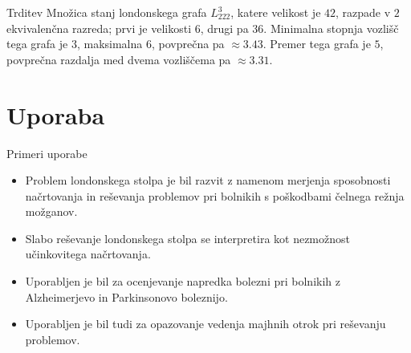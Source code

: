 \documentclass[dvipsnames]{beamer}
\newcommand{\graf}[1][G]{\ensuremath{#1 = (V(#1), E(#1))}}
\DeclareMathOperator {\stopnja} {deg}
\begin{document}
\begin{frame}
    \begin{block}{Trditev}
        \label{trd:simetrije-L222na3}
        Množica stanj londonskega grafa $L_{222}^3$, katere velikost je $42$, razpade v $2$ ekvivalenčna razreda; prvi je velikosti $6$, drugi pa $36$. Minimalna stopnja vozlišč tega grafa je $3$, maksimalna $6$, povprečna pa $\approx 3.43$. Premer tega grafa je $5$, povprečna razdalja med dvema vozliščema pa $\approx 3.31$. 
    \end{block}
\end{frame}

%    

\section{Uporaba}
\begin{frame}{Primeri uporabe}
    \begin{itemize}
        \item Problem londonskega stolpa je bil razvit z namenom merjenja sposobnosti načrtovanja in reševanja problemov pri bolnikih s poškodbami čelnega režnja možganov.
        \item Slabo reševanje londonskega stolpa se interpretira kot nezmožnost učinkovitega načrtovanja.
        \item Uporabljen je bil za ocenjevanje napredka bolezni pri bolnikih z Alzheimerjevo in Parkinsonovo boleznijo.
        \item Uporabljen je bil tudi za opazovanje vedenja majhnih otrok pri reševanju problemov.
    \end{itemize}
\end{frame}
\end{document}

